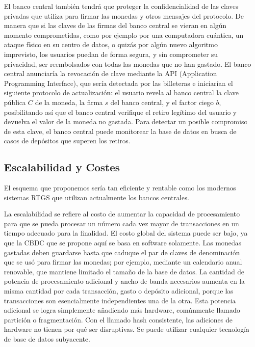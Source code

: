 \documentclass[a4paper,10pt]{article} %
\begin{document}
El banco central también tendrá que proteger la confidencialidad de las
claves privadas que utiliza para firmar las monedas y otros mensajes del
protocolo. De manera que si las claves de las firmas del banco central
se vieran en algún momento comprometidas, como por ejemplo por una
computadora cuántica, un ataque físico en su centro de datos, o quizás
por algún nuevo algoritmo imprevisto, los usuarios puedan de forma
segura, y sin comprometer su privacidad, ser reembolsados con todas las
monedas que no han gastado. El banco central anunciaría la revocación de
clave mediante la API (Application Programming Interface), que sería
detectada por las billeteras e iniciarían el siguiente protocolo de
actualización: el usuario revela al banco central la clave pública
$C$ de la moneda, la firma $s$ del banco central, y el factor
ciego $b$, posibilitando así que el banco central verifique el
retiro legítimo del usuario y devuelva el valor de la moneda no gastada.
Para detectar un posible compromiso de esta clave, el banco central
puede monitorear la base de datos en busca de casos de depósitos que
superen los retiros.

\subsection{Escalabilidad y Costes}\label{escalabilidad-y-costes}

El esquema que proponemos sería tan eficiente y rentable como los
modernos sistemas RTGS que utilizan actualmente los bancos centrales.

La escalabilidad se refiere al costo de aumentar la capacidad de
procesamiento para que se pueda procesar un número cada vez mayor de
transacciones en un tiempo adecuado para la finalidad. El costo global
del sistema puede ser bajo, ya que la CBDC que se propone aquí se basa
en software solamente. Las monedas gastadas deben guardarse hasta que
caduque el par de claves de denominación que se usó para firmar las
monedas; por ejemplo, mediante un calendario anual renovable, que
mantiene limitado el tamaño de la base de datos. La cantidad de potencia
de procesamiento adicional y ancho de banda necesarios aumenta en la
misma cantidad por cada transacción, gasto o depósito adicional, porque
las transacciones son esencialmente independientes una de la otra. Esta
potencia adicional se logra simplemente añadiendo más hardware,
comúnmente llamado partición o fragmentación. Con el llamado hash
consistente, las adiciones de hardware no tienen por qué ser
disruptivas. Se puede utilizar cualquier tecnología de base de datos
subyacente.
\end{document}
